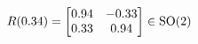 \documentclass[preview]{standalone}
\begin{document}
\begin{align*}
\special{dvisvgm:raw <g id='unique000'>}R(0.34) = \begin{bmatrix} 0.94 & -0.33 \\ 0.33 & 0.94 \end{bmatrix} \in \text{SO}(2)\special{dvisvgm:raw </g>}
\end{align*}
\end{document}
